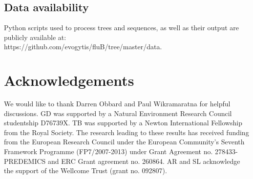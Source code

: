 \documentclass[11pt,oneside,letterpaper]{article}
\begin{document}
\subsection*{Data availability}
Python scripts used to process trees and sequences, as well as their output are publicly available at:
\\https://github.com/evogytis/fluB/tree/master/data.

\section*{Acknowledgements}
We would like to thank Darren Obbard and Paul Wikramaratna for helpful discussions.
GD was supported by a Natural Environment Research Council studentship D76739X.
TB was supported by a Newton International Fellowship from the Royal Society. 
The research leading to these results has received funding from the European Research Council under the European Community's Seventh Framework Programme (FP7/2007-2013) under Grant Agreement no. 278433-PREDEMICS and ERC Grant agreement no. 260864.
AR and SL acknowledge the support of the Wellcome Trust (grant no. 092807).



\end{document}
